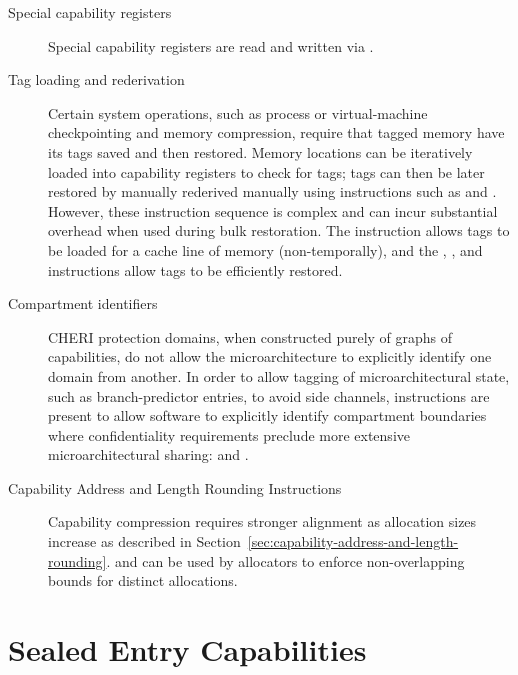 \begin{description}
\item[Special capability registers]
Special capability registers are read and written via .

\item[Tag loading and rederivation]
Certain system operations, such as process or virtual-machine checkpointing
and memory compression, require that tagged memory have its tags saved and
then restored.
Memory locations can be iteratively loaded into capability registers to check
for tags; tags can then be later restored by manually rederived manually using
instructions such as  and .
However, these instruction sequence is complex and can incur substantial
overhead when used during bulk restoration.
The  instruction allows tags to be loaded for a cache
line of memory (non-temporally), and the ,
, and  instructions allow tags to
be efficiently restored.

\item[Compartment identifiers]
CHERI protection domains, when constructed purely of graphs of capabilities,
do not allow the microarchitecture to explicitly identify one domain from
another.
In order to allow tagging of microarchitectural state, such as
branch-predictor entries, to avoid side channels, instructions are present to
allow software to explicitly identify compartment boundaries where
confidentiality requirements preclude more extensive microarchitectural
sharing:  and .

\item[Capability Address and Length Rounding Instructions]
Capability compression requires stronger alignment as allocation
sizes increase  as described in
Section~\ref{sec:capability-address-and-length-rounding}.
 and  can be used by allocators to enforce
non-overlapping bounds for distinct allocations.
\end{description}

\section{Sealed Entry Capabilities}
\label{sec:arch-sentry}

